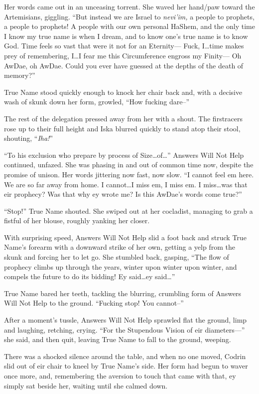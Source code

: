 Her words came out in an unceasing torrent. She waved her hand/paw toward the Artemisians, giggling. ``But instead we are Israel to \emph{nevi'im,} a people to prophets, a people to prophets! A people with our own personal HaShem, and the only time I know my true name is when I dream, and to know one's true name is to know God. Time feels so vast that were it not for an Eternity— Fuck, I\ldots time makes prey of remembering, I\ldots I fear me this Circumference engross my Finity— Oh AwDae, oh AwDae. Could you ever have guessed at the depths of the death of memory?''

True Name stood quickly enough to knock her chair back and, with a decisive wash of skunk down her form, growled, ``How fucking dare--''

The rest of the delegation pressed away from her with a shout. The firstracers rose up to their full height and Iska blurred quickly to stand atop their stool, shouting, ``\emph{Iha!}''

``To his exclusion who prepare by process of Size\ldots of\ldots{}'' Answers Will Not Help continued, unfazed. She was phasing in and out of common time now, despite the promise of unison. Her words jittering now fast, now slow. ``I cannot feel em here. We are so far away from home. I cannot\ldots I miss em, I miss em. I miss\ldots was that eir prophecy? Was that why ey wrote me? Is this AwDae's words come true?''

``Stop!'' True Name shouted. She swiped out at her cocladist, managing to grab a fistful of her blouse, roughly yanking her closer.

With surprising speed, Answers Will Not Help slid a foot back and struck True Name's forearm with a downward strike of her own, getting a yelp from the skunk and forcing her to let go. She stumbled back, gasping, ``The flow of prophecy climbs up through the years, winter upon winter upon winter, and compels the future to do its bidding! Ey said\ldots ey said\ldots{}''

True Name bared her teeth, tackling the blurring, crumbling form of Answers Will Not Help to the ground. ``Fucking stop! You cannot--''

After a moment's tussle, Answers Will Not Help sprawled flat the ground, limp and laughing, retching, crying. ``For the Stupendous Vision of eir diameters—'' she said, and then quit, leaving True Name to fall to the ground, weeping.

There was a shocked silence around the table, and when no one moved, Codrin slid out of eir chair to kneel by True Name's side. Her form had begun to waver once more, and, remembering the aversion to touch that came with that, ey simply sat beside her, waiting until she calmed down.


